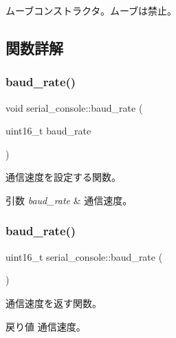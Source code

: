 ムーブコンストラクタ。ムーブは禁止。 

\subsection{関数詳解}
\hypertarget{classserial__console_a55aea672eefcfeadd7630531dc925613}{}\label{classserial__console_a55aea672eefcfeadd7630531dc925613} 
\subsubsection{\texorpdfstring{baud\+\_\+rate()}{baud\_rate()}\hspace{0.1cm}{\footnotesize\ttfamily [1/2]}}
{\footnotesize\ttfamily void serial\+\_\+console\+::baud\+\_\+rate (\begin{DoxyParamCaption}\item[{uint16\+\_\+t}]{baud\+\_\+rate }\end{DoxyParamCaption})}

通信速度を設定する関数。 
\begin{DoxyParams}{引数}
{\em baud\+\_\+rate} & 通信速度。 \\
\hline
\end{DoxyParams}
\hypertarget{classserial__console_ad090c8b90b07fc6ef25d816aa662b3a4}{}\label{classserial__console_ad090c8b90b07fc6ef25d816aa662b3a4} 
\subsubsection{\texorpdfstring{baud\+\_\+rate()}{baud\_rate()}\hspace{0.1cm}{\footnotesize\ttfamily [2/2]}}
{\footnotesize\ttfamily uint16\+\_\+t serial\+\_\+console\+::baud\+\_\+rate (\begin{DoxyParamCaption}{ }\end{DoxyParamCaption})}

通信速度を返す関数。 \begin{DoxyReturn}{戻り値}
通信速度。 
\end{DoxyReturn}
\hypertarget{classserial__console_acf0e666a73fcdbe99580e263a8c2c155}{}\label{classserial__console_acf0e666a73fcdbe99580e263a8c2c155} 
